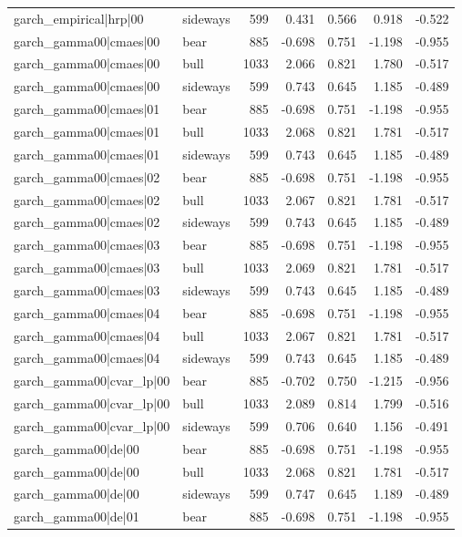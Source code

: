 \begin{table}
\begin{tabular}{llrrrrr}
garch\_empirical|hrp|00 & sideways & 599 & 0.431 & 0.566 & 0.918 & -0.522 \\
garch\_gamma00|cmaes|00 & bear & 885 & -0.698 & 0.751 & -1.198 & -0.955 \\
garch\_gamma00|cmaes|00 & bull & 1033 & 2.066 & 0.821 & 1.780 & -0.517 \\
garch\_gamma00|cmaes|00 & sideways & 599 & 0.743 & 0.645 & 1.185 & -0.489 \\
garch\_gamma00|cmaes|01 & bear & 885 & -0.698 & 0.751 & -1.198 & -0.955 \\
garch\_gamma00|cmaes|01 & bull & 1033 & 2.068 & 0.821 & 1.781 & -0.517 \\
garch\_gamma00|cmaes|01 & sideways & 599 & 0.743 & 0.645 & 1.185 & -0.489 \\
garch\_gamma00|cmaes|02 & bear & 885 & -0.698 & 0.751 & -1.198 & -0.955 \\
garch\_gamma00|cmaes|02 & bull & 1033 & 2.067 & 0.821 & 1.781 & -0.517 \\
garch\_gamma00|cmaes|02 & sideways & 599 & 0.743 & 0.645 & 1.185 & -0.489 \\
garch\_gamma00|cmaes|03 & bear & 885 & -0.698 & 0.751 & -1.198 & -0.955 \\
garch\_gamma00|cmaes|03 & bull & 1033 & 2.069 & 0.821 & 1.781 & -0.517 \\
garch\_gamma00|cmaes|03 & sideways & 599 & 0.743 & 0.645 & 1.185 & -0.489 \\
garch\_gamma00|cmaes|04 & bear & 885 & -0.698 & 0.751 & -1.198 & -0.955 \\
garch\_gamma00|cmaes|04 & bull & 1033 & 2.067 & 0.821 & 1.781 & -0.517 \\
garch\_gamma00|cmaes|04 & sideways & 599 & 0.743 & 0.645 & 1.185 & -0.489 \\
garch\_gamma00|cvar\_lp|00 & bear & 885 & -0.702 & 0.750 & -1.215 & -0.956 \\
garch\_gamma00|cvar\_lp|00 & bull & 1033 & 2.089 & 0.814 & 1.799 & -0.516 \\
garch\_gamma00|cvar\_lp|00 & sideways & 599 & 0.706 & 0.640 & 1.156 & -0.491 \\
garch\_gamma00|de|00 & bear & 885 & -0.698 & 0.751 & -1.198 & -0.955 \\
garch\_gamma00|de|00 & bull & 1033 & 2.068 & 0.821 & 1.781 & -0.517 \\
garch\_gamma00|de|00 & sideways & 599 & 0.747 & 0.645 & 1.189 & -0.489 \\
garch\_gamma00|de|01 & bear & 885 & -0.698 & 0.751 & -1.198 & -0.955 \\

\end{tabular}
\end{table}
